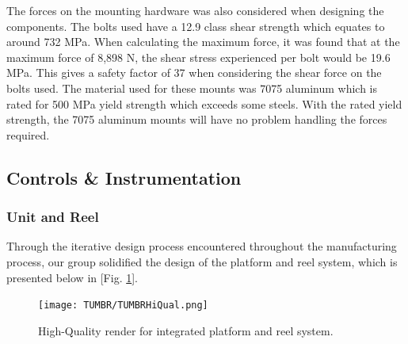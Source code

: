 The forces on the mounting hardware was also considered when designing the components. The bolts used have a 12.9 class shear strength which equates to around 732 MPa. When calculating the maximum force, it was found that at the maximum force of 8,898 N, the shear stress experienced per bolt would be 19.6 MPa. This gives a safety factor of 37 when considering the shear force on the bolts used. The material used for these mounts was 7075 aluminum which is rated for 500 MPa yield strength which exceeds some steels. With the rated yield strength, the 7075 aluminum mounts will have no problem handling the forces required.




\subsection{Controls \& Instrumentation}



\subsubsection{Unit and Reel}

\indent\indent Through the iterative design process encountered throughout the manufacturing process, our group solidified the design of the platform and reel system, which is presented below in [Fig. \ref{fig:TUMBRHiQual}]. 

\begin{figure}[ht]
  \centering
  \texttt{[image: TUMBR/TUMBRHiQual.png]}
  \caption{\label{fig:TUMBRHiQual}High-Quality render for integrated platform and reel system.}
\end{figure}

